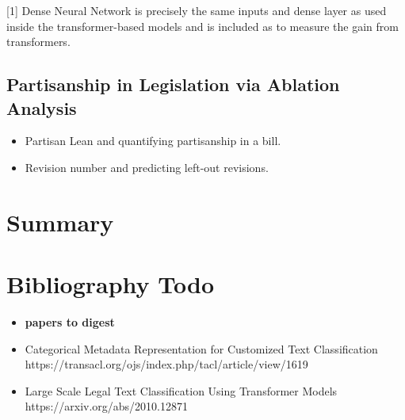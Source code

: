 \documentclass[11pt]{article}
\begin{document}
\vspace{3mm}

[1] Dense Neural Network is precisely the same inputs and dense layer as used inside the transformer-based models and is 
included as to measure the gain from transformers. 

\subsection{Partisanship in Legislation via Ablation Analysis}

\begin{itemize}
  \item Partisan Lean and quantifying partisanship in a bill.
  \item Revision number and predicting left-out revisions.
\end{itemize}

\section{Summary}




\section{Bibliography Todo}

\begin{itemize}
  \item \textbf{papers to digest}
  \item Categorical Metadata Representation for Customized Text Classification  https://transacl.org/ojs/index.php/tacl/article/view/1619
  \item Large Scale Legal Text Classification Using Transformer Models  https://arxiv.org/abs/2010.12871
\end{itemize}




\end{document}
